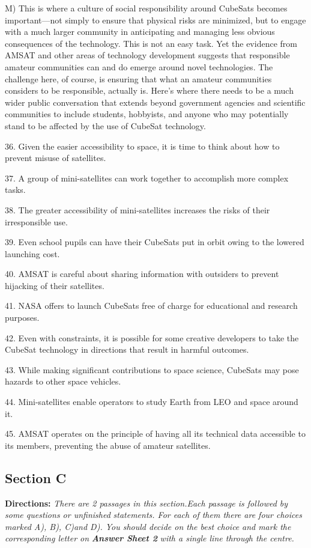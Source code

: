 \documentclass[UTF8,11pt]{ctexart}
\begin{document}
M) This is where a culture of social responsibility around CubeSats becomes important—not simply to ensure that physical risks are minimized, but to engage with a much larger community in anticipating and managing less obvious consequences of the technology. This is not an easy task. Yet the evidence from AMSAT and other areas of technology development suggests that responsible amateur communities can and do emerge around novel technologies. The challenge here, of course, is ensuring that what an amateur communities considers to be responsible, actually is. Here's where there needs to be a much wider public conversation that extends beyond government agencies and scientific communities to include students, hobbyists, and anyone who may potentially stand to be affected by the use of CubeSat technology.


36. Given the easier accessibility to space, it is time to think about how to prevent misuse of satellites.


37. A group of mini-satellites can work together to accomplish more complex tasks.


38. The greater accessibility of mini-satellites increases the risks of their irresponsible use.


39. Even school pupils can have their CubeSats put in orbit owing to the lowered launching cost.


40. AMSAT is careful about sharing information with outsiders to prevent hijacking of their satellites.


41. NASA offers to launch CubeSats free of charge for educational and research purposes.


42. Even with constraints, it is possible for some creative developers to take the CubeSat technology in directions that result in harmful outcomes.


43. While making significant contributions to space science, CubeSats may pose hazards to other space vehicles.


44. Mini-satellites enable operators to study Earth from LEO and space around it.


45. AMSAT operates on the principle of having all its technical data accessible to its members, preventing the abuse of amateur satellites.


\subsection*{\textbf{Section C}}


\textbf{Directions:}\textit{ There are 2 passages in this section.Each passage is followed by some questions or unfinished} \textit{statements. For each of them there are four choices marked A), B), C)and D). You should decide on the best choice} \textit{and mark the corresponding letter on}\textbf{\textit{ Answer Sheet 2}}\textit{ with a single line through the centre.}
\end{document}
